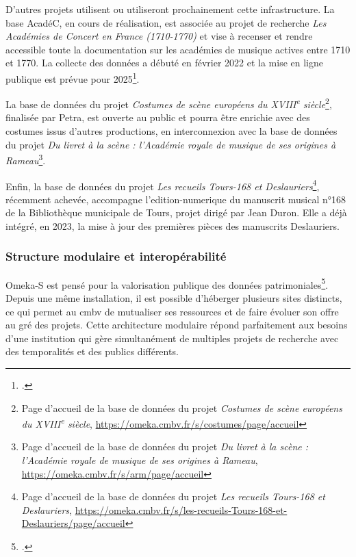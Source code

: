 D'autres projets utilisent ou utiliseront prochainement cette infrastructure. La base AcadéC, en cours de réalisation, est associée au projet de recherche \textit{Les Académies de Concert en France (1710-1770)} et vise à recenser et rendre accessible toute la documentation sur les académies de musique actives entre 1710 et 1770. La collecte des données a débuté en février 2022 et la mise en ligne publique est prévue pour 2025\footcite{AcadeCAcademiesConcert}.

La base de données du projet \textit{Costumes de scène européens du XVIII\textsuperscript{e} siècle}\footnote{Page d'accueil de la base de données du projet \textit{Costumes de scène européens du XVIII\textsuperscript{e} siècle}, \url{https://omeka.cmbv.fr/s/costumes/page/accueil}}, finalisée par Petra, est ouverte au public et pourra être enrichie avec des costumes issus d'autres productions, en interconnexion avec la base de données du projet \textit{Du livret à la scène : l'Académie royale de musique de ses origines à Rameau}\footnote{Page d'accueil de la base de données du projet \textit{Du livret à la scène : l'Académie royale de musique de ses origines à Rameau}, \url{https://omeka.cmbv.fr/s/arm/page/accueil}}.

Enfin, la base de données du projet \textit{Les recueils Tours-168 et Deslauriers}\footnote{Page d'accueil de la base de données du projet \textit{Les recueils Tours-168 et Deslauriers}, \url{https://omeka.cmbv.fr/s/les-recueils-Tours-168-et-Deslauriers/page/accueil}}, récemment achevée, accompagne l'\gls{edition-numerique} du manuscrit musical n°168 de la Bibliothèque municipale de Tours, projet dirigé par Jean Duron. Elle a déjà intégré, en 2023, la mise à jour des premières pièces des manuscrits Deslauriers.

\subsubsection{Structure modulaire et interopérabilité}

Omeka-S est pensé pour la valorisation publique des données patrimoniales\footcite{BaseFossard}. Depuis une même installation, il est possible d'héberger plusieurs sites distincts, ce qui permet au \gls{cmbv} de mutualiser ses ressources et de faire évoluer son offre au gré des projets. Cette architecture modulaire répond parfaitement aux besoins d'une institution qui gère simultanément de multiples projets de recherche avec des temporalités et des publics différents.


